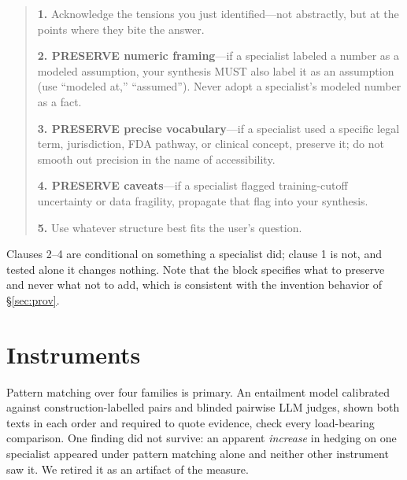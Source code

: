 \documentclass[11pt]{article}
\begin{document}
\begin{quote}\small
\textbf{1.} Acknowledge the tensions you just identified---not abstractly, but
at the points where they bite the answer.

\textbf{2. PRESERVE numeric framing}---if a specialist labeled a number as a
modeled assumption, your synthesis MUST also label it as an assumption (use
``modeled at,'' ``assumed''). Never adopt a specialist's modeled number as a
fact.

\textbf{3. PRESERVE precise vocabulary}---if a specialist used a specific legal
term, jurisdiction, FDA pathway, or clinical concept, preserve it; do not
smooth out precision in the name of accessibility.

\textbf{4. PRESERVE caveats}---if a specialist flagged training-cutoff
uncertainty or data fragility, propagate that flag into your synthesis.

\textbf{5.} Use whatever structure best fits the user's question.
\end{quote}

Clauses 2--4 are conditional on something a specialist did; clause 1 is not,
and tested alone it changes nothing. Note that the block specifies what to
preserve and never what not to add, which is consistent with the invention
behavior of \S\ref{sec:prov}.

\section{Instruments}
\label{app:instr}
Pattern matching over four families is primary. An entailment model calibrated
against construction-labelled pairs and blinded pairwise LLM judges, shown both
texts in each order and required to quote evidence, check every load-bearing
comparison. One finding did not survive: an apparent \emph{increase} in
hedging on one specialist appeared under pattern matching alone and neither
other instrument saw it. We retired it as an artifact of the measure.
\end{document}
